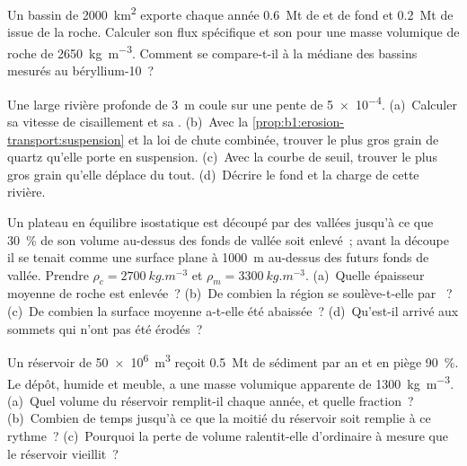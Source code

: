 \begin{exercise}[$\star\star$]\label{exo:b1:erosion-transport:9}
Un bassin de \qty{2000}{km^2} exporte chaque année \qty{0.6}{Mt} de  et
de fond et \qty{0.2}{Mt} de  issue de la roche. Calculer son flux
spécifique et son  pour une masse volumique de roche de
\qty{2650}{kg.m^{-3}}. Comment se compare-t-il à la médiane des bassins
mesurés au béryllium-10~?
\end{exercise}

\begin{exercise}[$\star\star\star$]\label{exo:b1:erosion-transport:10}
Une large rivière profonde de \qty{3}{m} coule sur une pente de \num{5e-4}. (a)~Calculer sa
vitesse de cisaillement et sa . (b)~Avec
la \cref{prop:b1:erosion-transport:suspension} et la loi de chute combinée,
trouver le plus gros grain de quartz qu'elle porte en suspension. (c)~Avec la courbe de
seuil, trouver le plus gros grain qu'elle déplace du tout. (d)~Décrire le fond et la
charge de cette rivière.
\end{exercise}

\begin{exercise}[$\star\star\star$]\label{exo:b1:erosion-transport:11}
Un plateau en équilibre isostatique est découpé par des vallées jusqu'à ce que \qty{30}{\percent}
de son volume au-dessus des fonds de vallée soit enlevé~; avant la découpe il se tenait
comme une surface plane à \qty{1000}{m} au-dessus des futurs fonds de vallée. Prendre
$\rho_c = \qty{2700}{kg.m^{-3}}$ et $\rho_m = \qty{3300}{kg.m^{-3}}$.
(a)~Quelle épaisseur moyenne de roche est enlevée~? (b)~De combien la région
se soulève-t-elle par ~? (c)~De combien la surface moyenne a-t-elle été abaissée~? (d)~Qu'est-il
arrivé aux sommets qui n'ont pas été érodés~?
\end{exercise}

\begin{exercise}[$\star\star\star$]\label{exo:b1:erosion-transport:12}
Un réservoir de \qty{50e6}{m^3} reçoit \qty{0.5}{Mt} de sédiment par an et
en piège \qty{90}{\percent}. Le dépôt, humide et meuble, a une masse volumique apparente
de \qty{1300}{kg.m^{-3}}. (a)~Quel volume du réservoir remplit-il chaque
année, et quelle fraction~? (b)~Combien de temps jusqu'à ce que la moitié du réservoir soit remplie à ce rythme~? (c)~Pourquoi
la perte de volume ralentit-elle d'ordinaire à mesure que le réservoir vieillit~?
\end{exercise}

